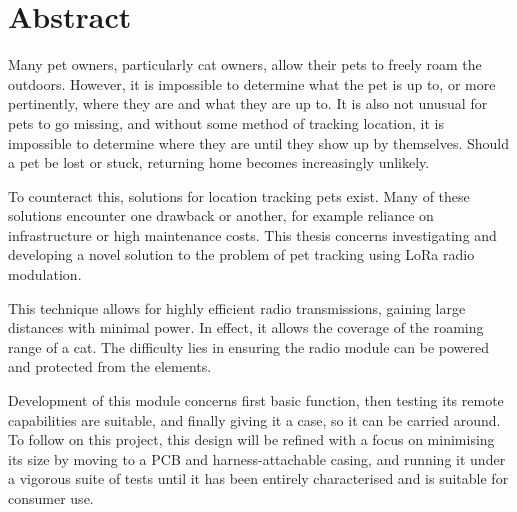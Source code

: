 \section{Abstract}
Many pet owners, particularly cat owners, allow their pets to freely roam the outdoors.
However, it is impossible to determine what the pet is up to, or more pertinently, 
where they are and what they are up to. It is also not unusual 
for pets to go missing, and without some method of tracking location, it is impossible to 
determine where they are until they show up by themselves. Should a pet be lost or stuck, 
returning home becomes increasingly unlikely. 

To counteract this, solutions for location tracking pets exist. Many of these solutions 
encounter one drawback or another, for example reliance on infrastructure or high maintenance costs.
This thesis concerns investigating and developing 
a novel solution to the problem of pet tracking using LoRa radio modulation.

This technique allows for highly efficient radio transmissions, gaining  
large distances with minimal power. In effect, it allows the coverage 
of the roaming range of a cat. The difficulty lies in ensuring the radio 
module can be powered and protected from the elements.

Development of this module concerns first basic function, then testing its remote capabilities 
are suitable, and finally giving it a case, so it can be carried around. 
To follow on this project, this design will be refined with a focus on minimising its size 
by moving to a PCB and harness-attachable casing, and running it under a vigorous suite of tests 
until it has been entirely characterised and is suitable for consumer use. 